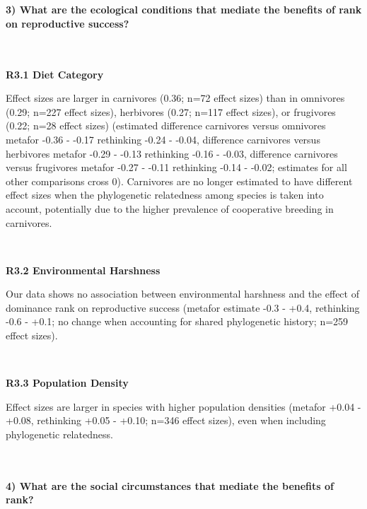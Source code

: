 \documentclass[
]{article}
\begin{document}
~

\hypertarget{what-are-the-ecological-conditions-that-mediate-the-benefits-of-rank-on-reproductive-success-2}{%
\paragraph{\texorpdfstring{\textbf{3) What are the ecological conditions
that mediate the benefits of rank on reproductive
success?}}{3) What are the ecological conditions that mediate the benefits of rank on reproductive success?}}\label{what-are-the-ecological-conditions-that-mediate-the-benefits-of-rank-on-reproductive-success-2}}

~

\textbf{R3.1 Diet Category}

Effect sizes are larger in carnivores (0.36; n=72 effect sizes) than in
omnivores (0.29; n=227 effect sizes), herbivores (0.27; n=117 effect
sizes), or frugivores (0.22; n=28 effect sizes) (estimated difference
carnivores versus omnivores metafor -0.36 - -0.17 rethinking -0.24 -
-0.04, difference carnivores versus herbivores metafor -0.29 - -0.13
rethinking -0.16 - -0.03, difference carnivores versus frugivores
metafor -0.27 - -0.11 rethinking -0.14 - -0.02; estimates for all other
comparisons cross 0). Carnivores are no longer estimated to have
different effect sizes when the phylogenetic relatedness among species
is taken into account, potentially due to the higher prevalence of
cooperative breeding in carnivores.

~

\textbf{R3.2 Environmental Harshness}

Our data shows no association between environmental harshness and the
effect of dominance rank on reproductive success (metafor estimate -0.3
- +0.4, rethinking -0.6 - +0.1; no change when accounting for shared
phylogenetic history; n=259 effect sizes).

~

\textbf{R3.3 Population Density}

Effect sizes are larger in species with higher population densities
(metafor +0.04 - +0.08, rethinking +0.05 - +0.10; n=346 effect sizes),
even when including phylogenetic relatedness.

~

\hypertarget{what-are-the-social-circumstances-that-mediate-the-benefits-of-rank-2}{%
\paragraph{\texorpdfstring{\textbf{4) What are the social circumstances
that mediate the benefits of
rank?}}{4) What are the social circumstances that mediate the benefits of rank?}}\label{what-are-the-social-circumstances-that-mediate-the-benefits-of-rank-2}}
\end{document}
